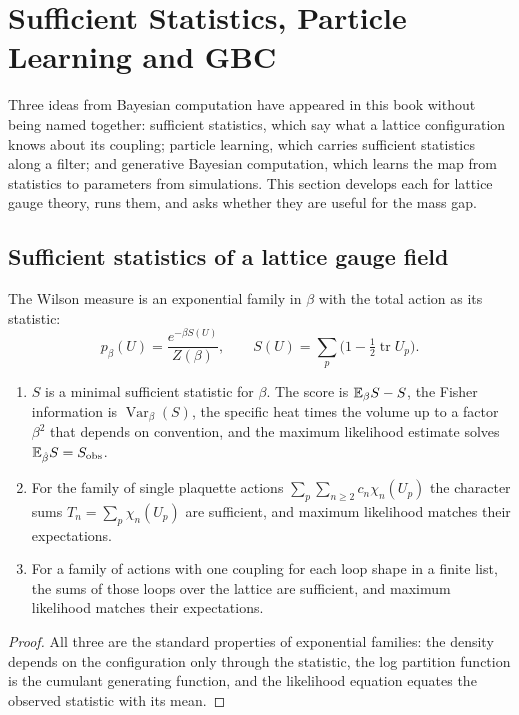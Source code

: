 \section{Sufficient Statistics, Particle Learning and GBC}\label{ch:plgbc}

Three ideas from Bayesian computation have appeared in this book without being named together: sufficient statistics, which say what a lattice configuration knows about its coupling; particle learning, which carries sufficient statistics along a filter; and generative Bayesian computation, which learns the map from statistics to parameters from simulations. This section develops each for lattice gauge theory, runs them, and asks whether they are useful for the mass gap.

\subsection{Sufficient statistics of a lattice gauge field}

The Wilson measure is an exponential family in $\beta$ with the total action as its statistic:
\[
p_\beta(U)=\frac{e^{-\beta S(U)}}{Z(\beta)},\qquad S(U)=\sum_p\big(1-\tfrac12\operatorname{tr}U_p\big).
\]

\begin{proposition}\label{prop:suff}
\begin{enumerate}
\item[(i)] $S$ is a minimal sufficient statistic for $\beta$. The score is $\mathbb{E}_\beta S-S$, the Fisher information is $\operatorname{Var}_\beta(S)$, the specific heat times the volume up to a factor $\beta^2$ that depends on convention, and the maximum likelihood estimate solves $\mathbb{E}_{\hat\beta}S=S_{\mathrm{obs}}$.
\item[(ii)] For the family of single plaquette actions $\sum_p\sum_{n\ge2}c_n\chi_n(U_p)$ the character sums $T_n=\sum_p\chi_n(U_p)$ are sufficient, and maximum likelihood matches their expectations.
\item[(iii)] For a family of actions with one coupling for each loop shape in a finite list, the sums of those loops over the lattice are sufficient, and maximum likelihood matches their expectations.
\end{enumerate}
\end{proposition}

\begin{proof}
All three are the standard properties of exponential families: the density depends on the configuration only through the statistic, the log partition function is the cumulant generating function, and the likelihood equation equates the observed statistic with its mean.
\end{proof}

